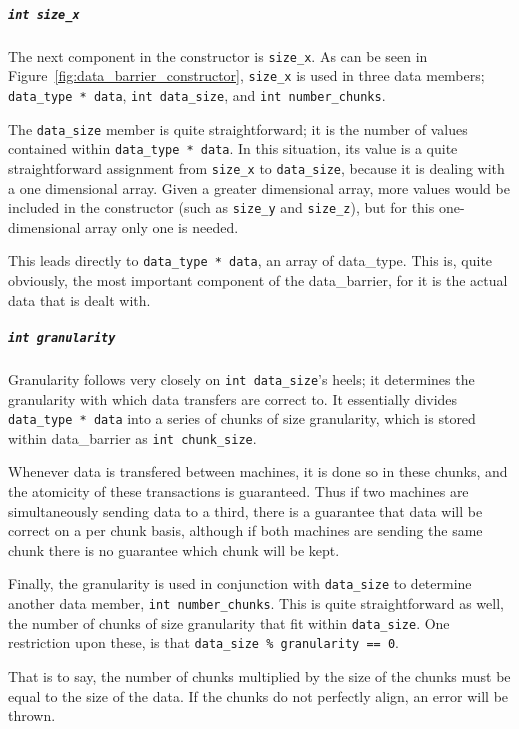 \documentclass[report.tex]{subfiles}
\begin{document}
  \subparagraph{\texttt{int size\_x}} %
  \label{subp:int_size_x}
      The next component in the constructor is \texttt{size\_x}. As can be seen in Figure~\ref{fig:data_barrier_constructor}, \texttt{size\_x} is used in three data members; \texttt{data\_type * data}, \texttt{int data\_size}, and \texttt{int number\_chunks}.

      The \texttt{data\_size} member is quite straightforward; it is the number of values contained within \texttt{data\_type * data}. In this situation, its value is a quite straightforward assignment from \texttt{size\_x} to \texttt{data\_size}, because it is dealing with a one dimensional array. Given a greater dimensional array, more values would be included in the constructor (such as \texttt{size\_y} and \texttt{size\_z}), but for this one-dimensional array only one is needed.

      This leads directly to \texttt{data\_type * data}, an array of data\_type. This is, quite obviously, the most important component of the data\_barrier, for it is the actual data that is dealt with.

  \subparagraph{\texttt{int granularity}} %
  \label{subp:int_granularity}
    Granularity follows very closely on \texttt{int data\_size}'s heels; it determines the granularity with which data transfers are correct to. It essentially divides \texttt{data\_type * data} into a series of chunks of size granularity, which is stored within data\_barrier as \texttt{int chunk\_size}.

    Whenever data is transfered between machines, it is done so in these chunks, and the atomicity of these transactions is guaranteed. Thus if two machines are simultaneously sending data to a third, there is a guarantee that data will be correct on a per chunk basis, although if both machines are sending the same chunk there is no guarantee which chunk will be kept.

    Finally, the granularity is used in conjunction with \texttt{data\_size} to determine another data member, \texttt{int number\_chunks}. This is quite straightforward as well, the number of chunks of size granularity that fit within \texttt{data\_size}. One restriction upon these, is that \texttt{data\_size \% granularity == 0}.

    That is to say, the number of chunks multiplied by the size of the chunks must be equal to the size of the data. If the chunks do not perfectly align, an error will be thrown.
\end{document}
